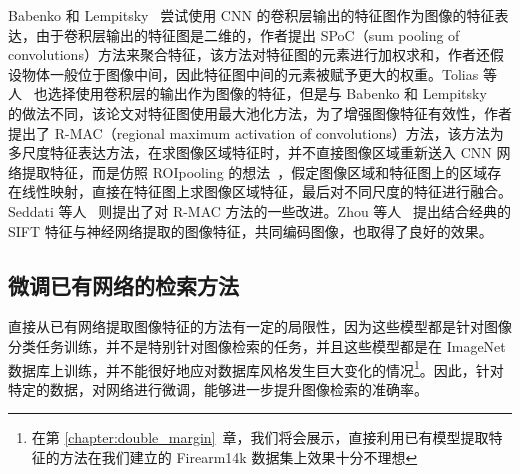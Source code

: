 Babenko 和 Lempitsky~\cite{Babenko2015AggregatingLD} 尝试使用 CNN 的卷积层输出的特征图作为图像的特征表达，由于卷积层输出的特征图是二维的，作者提出 SPoC（sum pooling of convolutions）方法来聚合特征，该方法对特征图的元素进行加权求和，作者还假设物体一般位于图像中间，因此特征图中间的元素被赋予更大的权重。Tolias 等人~\cite{Tolias2015ParticularOR} 也选择使用卷积层的输出作为图像的特征，但是与 Babenko 和 Lempitsky~\cite{Babenko2015AggregatingLD} 的做法不同，该论文对特征图使用最大池化方法，为了增强图像特征有效性，作者提出了 R-MAC（regional maximum activation of convolutions）方法，该方法为多尺度特征表达方法，在求图像区域特征时，并不直接图像区域重新送入 CNN 网络提取特征，而是仿照 ROIpooling 的想法~\cite{Ren2017FasterRT}，假定图像区域和特征图上的区域存在线性映射，直接在特征图上求图像区域特征，最后对不同尺度的特征进行融合。Seddati 等人~\cite{Seddati2017TowardsGP} 则提出了对 R-MAC 方法的一些改进。Zhou 等人~\cite{Zhou2017CollaborativeIE} 提出结合经典的 SIFT 特征与神经网络提取的图像特征，共同编码图像，也取得了良好的效果。

\subsection{微调已有网络的检索方法}

直接从已有网络提取图像特征的方法有一定的局限性，因为这些模型都是针对图像分类任务训练，并不是特别针对图像检索的任务，并且这些模型都是在 ImageNet 数据库上训练，并不能很好地应对数据库风格发生巨大变化的情况\footnote{在第 \ref{chapter:double_margin}~章，我们将会展示，直接利用已有模型提取特征的方法在我们建立的 Firearm14k 数据集上效果十分不理想}。因此，针对特定的数据，对网络进行微调，能够进一步提升图像检索的准确率。

